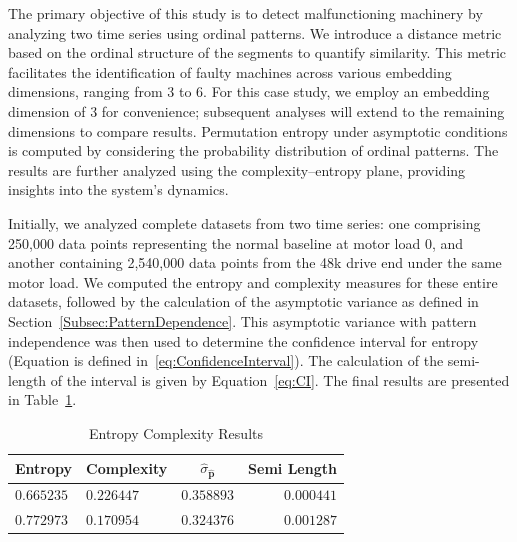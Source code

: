 The primary objective of this study is to detect malfunctioning machinery by analyzing two time series using ordinal patterns. We introduce a distance metric based on the ordinal structure of the segments to quantify similarity. This metric facilitates the identification of faulty machines across various embedding dimensions, ranging from $3$ to $6$. For this case study, we employ an embedding dimension of $3$ for convenience; subsequent analyses will extend to the remaining dimensions to compare results. Permutation entropy under asymptotic conditions is computed by considering the probability distribution of ordinal patterns. The results are further analyzed using the complexity–entropy plane, providing insights into the system's dynamics.

Initially, we analyzed complete datasets from two time series: one comprising 250,000 data points representing the normal baseline at motor load 0, and another containing 2,540,000 data points from the 48k drive end under the same motor load. We computed the entropy and complexity measures for these entire datasets, followed by the calculation of the asymptotic variance as defined in Section~\ref{Subsec:PatternDependence}. This asymptotic variance with pattern independence was then used to determine the confidence interval for entropy (Equation is defined in~\ref{eq:ConfidenceInterval}). The calculation of the semi-length of the interval is given by Equation~\ref{eq:CI}. 
The final results are presented in Table~\ref{tab:EnComplexResults}.

\begin{table}[H]
	\centering
	\begin{tabular}{llcr}
		\toprule
		Entropy  & Complexity  & $\widehat{\sigma}_{\widehat{\mathbf{p}}}$ & Semi Length \\
		\midrule
		$0.665235$ & $0.226447$ & $0.358893$ & $0.000441$\\ 
		$0.772973$ & $0.170954$ & $0.324376$ & $0.001287$\\
		\bottomrule
	\end{tabular}
	\caption{Entropy Complexity Results}
	\label{tab:EnComplexResults}
\end{table}

